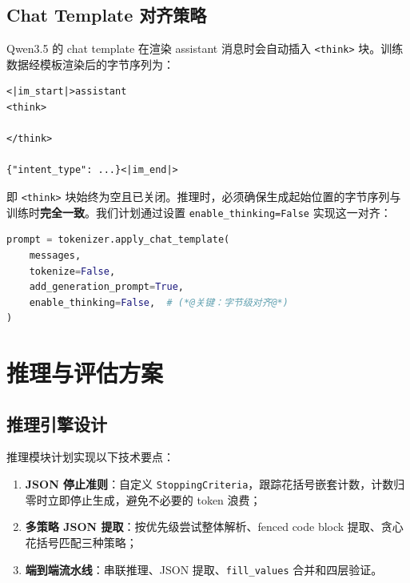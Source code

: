 \documentclass[12pt, a4paper]{article}
\newcommand{\fillvalues}{\texttt{fill\_values}}
\begin{document}
\subsection{Chat Template 对齐策略}
\label{sec:chat-template}

Qwen3.5 的 chat template 在渲染 assistant 消息时会自动插入 \texttt{<think>} 块。训练数据经模板渲染后的字节序列为：

\begin{lstlisting}[language={}, numbers=none]
<|im_start|>assistant
<think>

</think>

{"intent_type": ...}<|im_end|>
\end{lstlisting}

\noindent
即 \texttt{<think>} 块始终为空且已关闭。推理时，必须确保生成起始位置的字节序列与训练时\textbf{完全一致}。我们计划通过设置 \texttt{enable\_thinking=False} 实现这一对齐：

\begin{lstlisting}[language=Python, caption={推理时的 chat template 对齐}]
prompt = tokenizer.apply_chat_template(
    messages,
    tokenize=False,
    add_generation_prompt=True,
    enable_thinking=False,  # (*@关键：字节级对齐@*)
)
\end{lstlisting}

\section{推理与评估方案}
\label{sec:eval}

\subsection{推理引擎设计}

推理模块计划实现以下技术要点：

\begin{enumerate}
  \item \textbf{JSON 停止准则}：自定义 \texttt{StoppingCriteria}，跟踪花括号嵌套计数，计数归零时立即停止生成，避免不必要的 token 浪费；
  \item \textbf{多策略 JSON 提取}：按优先级尝试整体解析、fenced code block 提取、贪心花括号匹配三种策略；
  \item \textbf{端到端流水线}：串联推理、JSON 提取、\fillvalues{} 合并和四层验证。
\end{enumerate}
\end{document}
